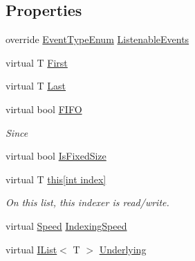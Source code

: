 \subsection*{Properties}
\begin{DoxyCompactItemize}
\item 
override \hyperlink{namespace_c5_a9143bfd561fffa025d21561674758008}{Event\+Type\+Enum} \hyperlink{class_c5_1_1_array_list_a8560c6e1b75c9d706d2d2d2618269d4f}{Listenable\+Events}
\item 
virtual T \hyperlink{class_c5_1_1_array_list_afbe0bbad61f1e2ac5105fe3a73d4d9c8}{First}
\item 
virtual T \hyperlink{class_c5_1_1_array_list_a520a0e6f4b6b9038bc9ad63770c78a95}{Last}
\item 
virtual bool \hyperlink{class_c5_1_1_array_list_afe367da5aabd34c3c4af20648deaf6a6}{F\+I\+F\+O}
\begin{DoxyCompactList}\small\item\em Since \end{DoxyCompactList}\item 
virtual bool \hyperlink{class_c5_1_1_array_list_a8fca7fcada0dce088679de34c1cb9c37}{Is\+Fixed\+Size}
\item 
virtual T \hyperlink{class_c5_1_1_array_list_a2a4990b7502658c6f8bbebe2a3eea351}{this\mbox{[}int index\mbox{]}}
\begin{DoxyCompactList}\small\item\em On this list, this indexer is read/write. \end{DoxyCompactList}\item 
virtual \hyperlink{namespace_c5_a615ba88dcdaa8d5a3c5f833a73d7fad6}{Speed} \hyperlink{class_c5_1_1_array_list_ae98cfa9bac197c389bbb16159a116c04}{Indexing\+Speed}
\item 
virtual \hyperlink{interface_c5_1_1_i_list}{I\+List}$<$ T $>$ \hyperlink{class_c5_1_1_array_list_a41d739fd8a2d169b3121cc05871323f0}{Underlying}

\end{DoxyCompactItemize}
